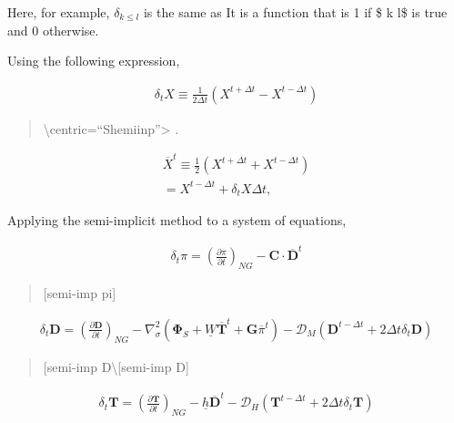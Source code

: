 Here, for example, \(\delta_{k \leq l}\) is the same as It is a function
that is 1 if \$ k \leq l\$ is true and 0 otherwise.

Using the following expression,

\begin{eqnarray}
  \delta_{t} {X} \equiv \frac{1}{2 \Delta t} 
        \left( {X}^{t+\Delta t} - {X}^{t-\Delta t} \right)
\end{eqnarray}

\begin{quote}
\protect\hypertarget{Shemiinp}{}{\textbackslash centric=``Shemiinp\centric''\textgreater{}
}.
\end{quote}

\begin{eqnarray}
    \overline{X}^{t}
   \equiv  \frac{1}{2} \left( {X}^{t+\Delta t} 
                              + {X}^{t-\Delta t} \right)
         \\ 
   =  {X}^{t-\Delta t} + \delta_{t} {X} \Delta t   ,
\end{eqnarray}

Applying the semi-implicit method to a system of equations,

\begin{eqnarray}
  \delta_{t} \pi =
          \left( \frac{\partial \pi}{\partial t} \right)_{NG}  
     - \mathbf{C} \cdot \overline{ \mathbf{D} }^{t}
\end{eqnarray}

\begin{quote}
\protect\hypertarget{semi-impux20pi}{}{{[}semi-imp pi{]}}
\end{quote}

\begin{eqnarray}
  \delta_{t} \mathbf{D} =
          \left( \frac{\partial \mathbf{D}}{\partial t} \right)_{NG}  
          - \nabla^{2}_{\sigma} ( \mathbf{\Phi}_{S} 
                                  + \underline{W} 
                                     \overline{ \mathbf{T} }^{t}
                                  + \mathbf{G}
                                  \overline{\pi}^{t} ) 
          - {\mathcal D}_M ( \mathbf{D}^{t-\Delta t} 
                         + 2 \Delta t \delta_{t} \mathbf{D} )
\end{eqnarray}

\begin{quote}
\protect\hypertarget{semi-impux20D}{}{{[}semi-imp
D\textbackslash{[}semi-imp D{]}}
\end{quote}

\begin{eqnarray}
  \delta_{t} \mathbf{T} =
        \left( \frac{\partial \mathbf{T}}{\partial t} \right)_{NG}  
         - \underline{h} \overline{ \mathbf{D} }^{t} 
         - {\mathcal D}_H ( \mathbf{T}^{t-\Delta t}
                        + 2 \Delta t \delta_{t} \mathbf{T} )
\end{eqnarray}

